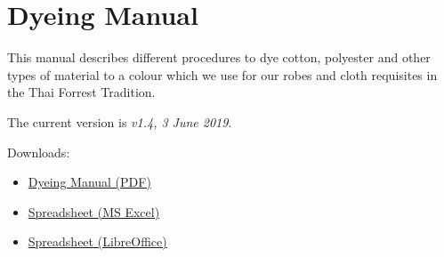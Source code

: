 \chapter{Dyeing Manual}

This manual describes different procedures to dye cotton, polyester and
other types of material to a colour which we use for our robes and cloth
requisites in the Thai Forrest Tradition.

The current version is \emph{v1.4, 3 June 2019}.

Downloads:

\begin{itemize}
\tightlist
\item
  \href{https://ticivara.github.io/dyeing-manual/Dyeing-Manual.pdf}{Dyeing
  Manual (PDF)}
\item
  \href{https://ticivara.github.io/dyeing-manual/Dyeing-Manual-Excel.xlsx}{Spreadsheet
  (MS Excel)}
\item
  \href{https://ticivara.github.io/dyeing-manual/Dyeing-Manual.ods}{Spreadsheet
  (LibreOffice)}
\end{itemize}

